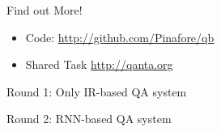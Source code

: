 \documentclass[aspectratio=169,xcolor=dvipsnames]{beamer}
\newcommand{\fsi}[2]{
\begin{frame}[plain]
\vspace*{-1pt}
\makebox[\linewidth]{\texttt{[image: \#1]}}
\begin{center}
#2
\end{center}
\end{frame}
}
\begin{document}
\begin{frame}{Find out More!}

		\begin{itemize}
			\item Code: \url{http://github.com/Pinafore/qb}
                        \item Shared Task \url{http://qanta.org}
		\end{itemize}

\end{frame}

\fsi{qb/trick/round_one}{Round 1: Only IR-based QA system}
\fsi{qb/trick/round_two}{Round 2: RNN-based QA system}




\end{document}
